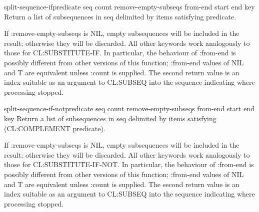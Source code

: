 \begin{function}{split-sequence-if}{predicate seq \key count
    remove-empty-subseqs from-end start end key}
Return a list of subsequences in seq delimited by items satisfying
predicate.

If :remove-empty-subseqs is NIL, empty subsequences will be included
in the result; otherwise they will be discarded.  All other keywords
work analogously to those for CL:SUBSTITUTE-IF.  In particular, the
behaviour of :from-end is possibly different from other versions of
this function; :from-end values of NIL and T are equivalent unless
:count is supplied. The second return value is an index suitable as an
argument to CL:SUBSEQ into the sequence indicating where processing
stopped.  
\end{function}

\begin{function}{split-sequence-if-not}{predicate seq \key count
    remove-empty-subseqs from-end start end key}
  Return a list of subsequences in seq delimited by items satisfying
  (CL:COMPLEMENT predicate).

  If :remove-empty-subseqs is NIL, empty subsequences will be included
  in the result; otherwise they will be discarded. All other keywords
  work analogously to those for CL:SUBSTITUTE-IF-NOT. In particular,
  the behaviour of :from-end is possibly different from other versions
  of this function; :from-end values of NIL and T are equivalent
  unless :count is supplied. The second return value is an index
  suitable as an argument to CL:SUBSEQ into the sequence indicating
  where processing stopped.
\end{function}

